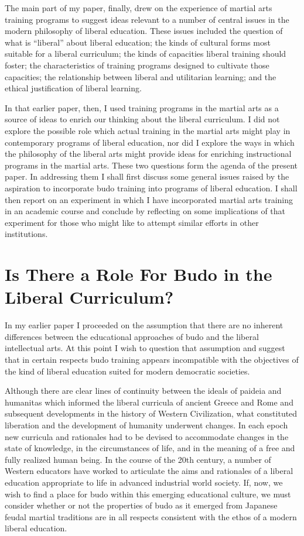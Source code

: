 The main part of my paper, finally, drew on the experience of martial arts training programs to suggest ideas relevant to a number of central issues in the modern philosophy of liberal education. These issues included the question of what is ``liberal'' about liberal education; the kinds of cultural forms most suitable for a liberal curriculum; the kinds of capacities liberal training should foster; the characteristics of training programs designed to cultivate those capacities; the relationship between liberal and utilitarian learning; and the ethical justification of liberal learning. 

In that earlier paper, then, I used training programs in the martial arts as a source of ideas to enrich our thinking about the liberal curriculum. I did not explore the possible role which actual training in the martial arts might play in contemporary programs of liberal education, nor did I explore the ways in which the philosophy of the liberal arts might provide ideas for enriching instructional programs in the martial arts. These two questions form the agenda of the present paper. In addressing them I shall first discuss some general issues raised by the aspiration to incorporate budo training into programs of liberal education. I shall then report on an experiment in which I have incorporated martial arts training in an academic course and conclude by reflecting on some implications of that experiment for those who might like to attempt similar efforts in other institutions.

\section*{Is There a Role For Budo in the Liberal Curriculum?}

In my earlier paper I proceeded on the assumption that there are no inherent differences between the educational approaches of budo and the liberal intellectual arts. At this point I wish to question that assumption and suggest that in certain respects budo training appears incompatible with the objectives of the kind of liberal education suited for modern democratic societies.

Although there are clear lines of continuity between the ideals of paideia and humanitas which informed the liberal curricula of ancient Greece and Rome and subsequent developments in the history of Western Civilization, what constituted liberation and the development of humanity underwent changes. In each epoch new curricula and rationales had to be devised to accommodate changes in the state of knowledge, in the circumstances of life, and in the meaning of a free and fully realized human being. In the course of the 20th century, a number of Western educators have worked to articulate the aims and rationales of a liberal education appropriate to life in advanced industrial world society. If, now, we wish to find a place for budo within this emerging educational culture, we must consider whether or not the properties of budo as it emerged from Japanese feudal martial traditions are in all respects consistent with the ethos of a modern liberal education.


